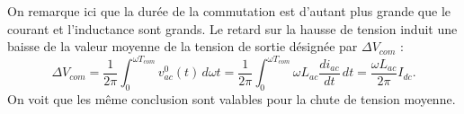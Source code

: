 			On remarque ici que la durée de la commutation est d'autant plus grande que le courant et l'inductance sont grands. Le retard sur la hausse de tension induit une baisse de la valeur moyenne de la tension de sortie désignée par $\Delta V_{com}$ : 			
			\begin{equation}
				\Delta V_{com} = \frac{1}{2\pi} \int _0 ^{\omega T_{com}} v_{ac}^0(t) \, d\omega t = \frac{1}{2\pi} \int _0 ^{\omega T_{com}} \omega L_{ac}\frac{di_{ac}}{dt} \, dt = \frac{\omega L_{ac}}{2\pi} I_{dc}.
 			\end{equation}
 			On voit que les même conclusion sont valables pour la chute de tension moyenne. 
